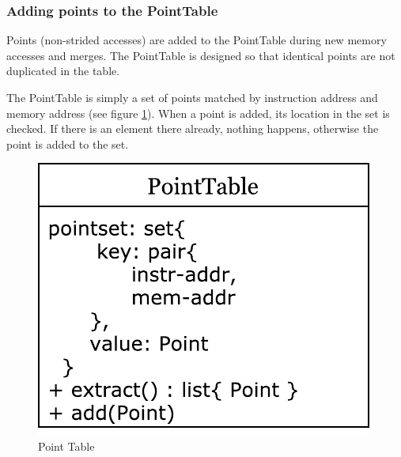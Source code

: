\documentclass[12pt,twoside]{reedthesis}
\begin{document}
		\subsubsection{Adding points to the PointTable}
		
			Points (non-strided accesses) are added to the PointTable during new memory accesses and merges. The PointTable is designed so that identical points are not duplicated in the table. 
			
			The PointTable is simply a set of points matched by instruction address and memory address (see figure \ref{fig:point-table}). When a point is added, its location in the set is checked. If there is an element there already, nothing happens, otherwise the point is added to the set. 
			
			\begin{figure}
				\caption{Point Table}
				\label{fig:point-table}
				\includegraphics[scale=0.8]{point_data.pdf}
			\end{figure}
		
			
			
			
\end{document}
